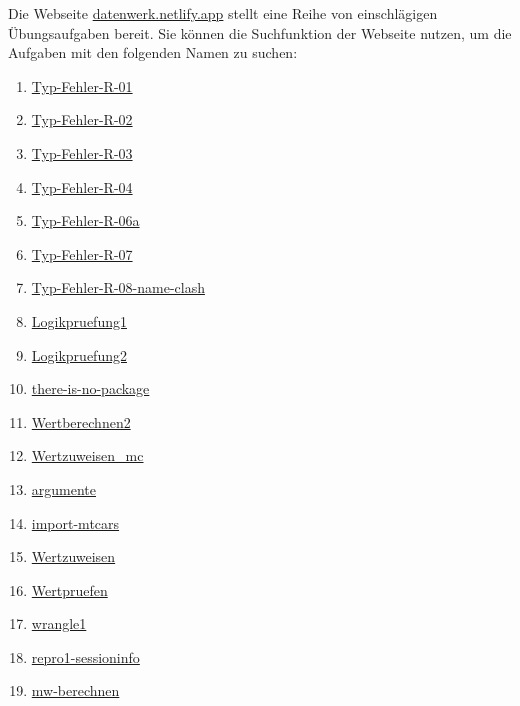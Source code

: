 \documentclass[
  a4paper,
  DIV=11]{scrreprt}
\providecommand{\tightlist}{%
  \setlength{\itemsep}{0pt}\setlength{\parskip}{0pt}}\usepackage{longtable,booktabs,array}
\theoremstyle{definition}
\theoremstyle{definition}
\theoremstyle{definition}
\theoremstyle{remark}
\begin{document}
Die Webseite \href{https://datenwerk.netlify.app}{datenwerk.netlify.app}
stellt eine Reihe von einschlägigen Übungsaufgaben bereit. Sie können
die Suchfunktion der Webseite nutzen, um die Aufgaben mit den folgenden
Namen zu suchen:

\begin{enumerate}
\def\labelenumi{\arabic{enumi}.}
\tightlist
\item
  \href{https://datenwerk.netlify.app/posts/typ-fehler-r-01/typ-fehler-r-01.html}{Typ-Fehler-R-01}
\item
  \href{https://datenwerk.netlify.app/posts/typ-fehler-r-02/typ-fehler-r-02.html}{Typ-Fehler-R-02}
\item
  \href{https://datenwerk.netlify.app/posts/typ-fehler-r-03/typ-fehler-r-03.html}{Typ-Fehler-R-03}
\item
  \href{https://datenwerk.netlify.app/posts/typ-fehler-r-04/typ-fehler-r-04.html}{Typ-Fehler-R-04}
\item
  \href{https://datenwerk.netlify.app/posts/typ-fehler-r-06a/typ-fehler-r-06a.html}{Typ-Fehler-R-06a}
\item
  \href{https://datenwerk.netlify.app/posts/typ-fehler-r-07/typ-fehler-r-07.html}{Typ-Fehler-R-07}
\item
  \href{https://datenwerk.netlify.app/posts/typ-fehler-r-08-name-clash/typ-fehler-r-08-name-clash}{Typ-Fehler-R-08-name-clash}
\item
  \href{https://datenwerk.netlify.app/posts/logikpruefung1/logikpruefung1}{Logikpruefung1}
\item
  \href{https://datenwerk.netlify.app/posts/logikpruefung2/logikpruefung2}{Logikpruefung2}
\item
  \href{https://datenwerk.netlify.app/posts/there-is-no-package/there-is-no-package.html}{there-is-no-package}
\item
  \href{https://datenwerk.netlify.app/posts/wertberechnen2/wertberechnen2}{Wertberechnen2}
\item
  \href{https://datenwerk.netlify.app/posts/wertzuweisen_mc/wertzuweisen_mc}{Wertzuweisen\_mc}
\item
  \href{https://datenwerk.netlify.app/posts/argumente/argumente.html}{argumente}
\item
  \href{https://datenwerk.netlify.app/posts/import-mtcars/import-mtcars.html}{import-mtcars}
\item
  \href{https://datenwerk.netlify.app/posts/wertzuweisen/wertzuweisen}{Wertzuweisen}
\item
  \href{https://datenwerk.netlify.app/posts/wertpruefen/wertpruefen}{Wertpruefen}
\item
  \href{https://datenwerk.netlify.app/posts/wrangle1/wrangle1.html}{wrangle1}
\item
  \href{https://datenwerk.netlify.app/posts/repro1-sessioninfo/repro1-sessioninfo.html}{repro1-sessioninfo}
\item
  \href{https://datenwerk.netlify.app/posts/mw-berechnen/mw-berechnen}{mw-berechnen}
\end{enumerate}
\end{document}
